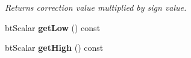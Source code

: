 \begin{DoxyCompactItemize}
\begin{DoxyCompactList}\small\item\em Returns correction value multiplied by sign value. \end{DoxyCompactList}\item 
\hypertarget{classbt_angular_limit_a472312436443f98f839a0be4f79a4e99}{bt\+Scalar {\bfseries get\+Low} () const }\label{classbt_angular_limit_a472312436443f98f839a0be4f79a4e99}

\item 
\hypertarget{classbt_angular_limit_a61417de8c4991bf9205ad51f78a278da}{bt\+Scalar {\bfseries get\+High} () const }\label{classbt_angular_limit_a61417de8c4991bf9205ad51f78a278da}

\end{DoxyCompactItemize}


